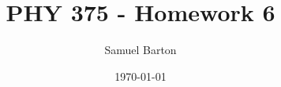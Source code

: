 \documentclass[12pt]{article}
\title{PHY 375 - Homework 6}
\author{Samuel Barton}
\date{\today}
\begin{document}
	
	\maketitle

	
	
	\pagebreak
	
	
\end{document}
